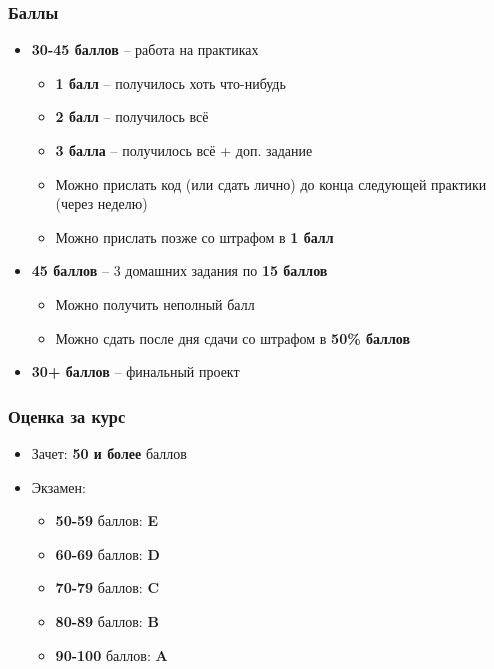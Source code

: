 \documentclass[10pt]{beamer}
\begin{document}
\begin{frame}
\frametitle{Баллы}
\begin{itemize}
\pause
\item \textbf{30-45 баллов} -- работа на практиках
\pause
\begin{itemize}
\item \textbf{1 балл} -- получилось хоть что-нибудь
\item \textbf{2 балл} -- получилось всё
\item \textbf{3 балла} -- получилось всё + доп. задание
\pause
\item Можно прислать код (или сдать лично) до конца следующей практики (через неделю)
\pause
\item Можно прислать позже со штрафом в \alert{\textbf{1 балл}}
\end{itemize}
\pause
\item \textbf{45 баллов} -- 3 домашних задания по \textbf{15 баллов}
\pause
\begin{itemize}
\item Можно получить неполный балл
\pause
\item Можно сдать после дня сдачи со штрафом в \alert{\textbf{50\% баллов}}
\end{itemize}
\pause
\item \textbf{30+ баллов} -- финальный проект
\end{itemize}
\end{frame}

\begin{frame}
\frametitle{Оценка за курс}
\pause
\begin{itemize}
\item Зачет: \textbf{50 и более} баллов
\pause
\item Экзамен:
\begin{itemize}
\item \textbf{50-59} баллов: \textbf{E}
\item \textbf{60-69} баллов: \textbf{D}
\item \textbf{70-79} баллов: \textbf{C}
\item \textbf{80-89} баллов: \textbf{B}
\item \textbf{90-100} баллов: \textbf{A}
\end{itemize}
\end{itemize}
\end{frame}
\end{document}
